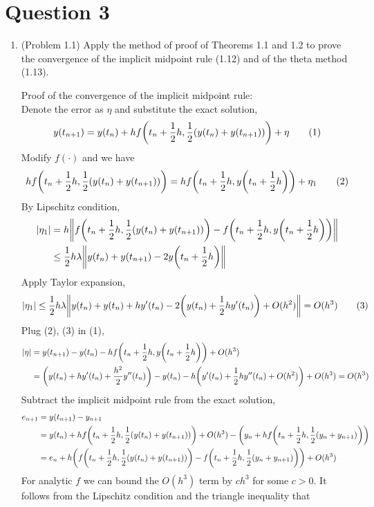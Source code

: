 \documentclass[10pt]{report}
\newcommand{\abs}[1] {\left| #1 \right|}
\DeclarePairedDelimiter\autoparen{(}{)}
\newcommand{\pa}[1]{\autoparen*{#1}}
\DeclarePairedDelimiter\autodvert{\Vert}{\Vert}
\newcommand{\norm}[1]{\autodvert*{#1}}
\begin{document}
\section*{Question 3}
\begin{enumerate}
	\item 
	(Problem 1.1) Apply the method of proof of Theorems 1.1 and 1.2 to prove the convergence of the implicit midpoint rule (1.12) and of the theta method (1.13).
	
	Proof of the convergence of the implicit midpoint rule:\\
	Denote the error as $\eta$ and substitute the exact solution,
	\[
	y(t_{n+1}) = y(t_n) + hf\pa{t_n+\frac{1}{2}h, \frac{1}{2}(y(t_n) + y(t_{n+1}))} + \eta	\tag{1}
	\]
	Modify $f(\cdot)$ and we have
	\[
	hf\pa{t_n+\frac{1}{2}h, \frac{1}{2}(y(t_n) + y(t_{n+1}))}
	= hf\pa{t_n+\frac{1}{2}h, y\pa{t_n+\frac{1}{2}h}} + \eta_1	\tag{2}
	\]
	By Lipschitz condition,
	\begin{align*}
	\abs{\eta_1} 
	&= h\norm{f\pa{t_n+\frac{1}{2}h, \frac{1}{2}(y(t_n) + y(t_{n+1}))} - f\pa{t_n+\frac{1}{2}h, y\pa{t_n+\frac{1}{2}h}}}\\
	&\le \frac{1}{2}h\lambda \norm{y(t_n) + y(t_{n+1}) - 2y\pa{t_n+\frac{1}{2}h}}
	\end{align*}
	Apply Taylor expansion,
	\[
	\abs{\eta_1} 
	\le \frac{1}{2}h\lambda \norm{y(t_n) + y(t_n) + hy'(t_n) - 2\pa{y(t_n) + \frac{1}{2}hy'(t_n)} + O(h^2)}
	= O(h^3)	\tag{3}
	\]
	Plug (2), (3) in (1),
	\begin{align*}
	\abs{\eta}
	&= y(t_{n+1}) - y(t_n) - hf\pa{t_n+\frac{1}{2}h, y\pa{t_n+\frac{1}{2}h}} + O(h^3)\\
	&= \pa{y(t_n) + hy'(t_n) + \frac{h^2}{2}y''(t_n)} - y(t_n) - h\pa{y'(t_n) + \frac{1}{2}hy''(t_n) + O(h^2)} + O(h^3) = O(h^3)
	\end{align*}
	Subtract the implicit midpoint rule from the exact solution,
	\begin{align*}
		e_{n+1} &= y(t_{n+1}) - y_{n+1}\\
		&= y(t_n) + hf\pa{t_n + \frac{1}{2}h, \frac{1}{2}(y(t_n) + y(t_{n+1}))} + O(h^3) - \pa{y_n + hf\pa{t_n + \frac{1}{2}h, \frac{1}{2}(y_n + y_{n+1})}}\\
		&= e_n + h\pa{f\pa{t_n + \frac{1}{2}h, \frac{1}{2}(y(t_n) + y(t_{n+1}))} - f\pa{t_n + \frac{1}{2}h, \frac{1}{2}(y_n + y_{n+1})}} + O(h^3) 
	\end{align*}
	For analytic $f$ we can bound the $O(h^3)$ term by $ch^3$ for some $c > 0$. It follows from the Lipschitz condition and the triangle inequality that

\end{enumerate}
\end{document}
